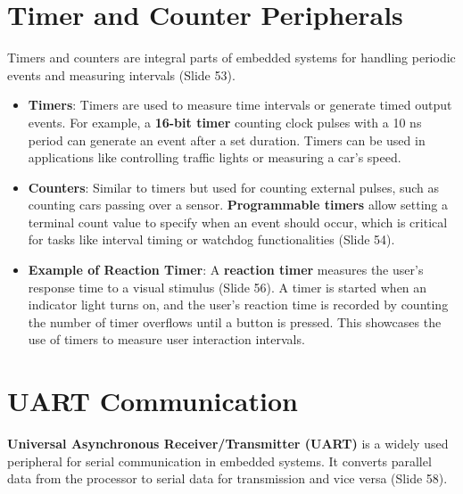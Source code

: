 \documentclass[
  14pt,
  a4paper,
  numbers=noendperiod,
  headinclude=true,
  footinclude=true,
  DIV=calc]{scrreprt}
\begin{document}
\section{Timer and Counter
Peripherals}\label{timer-and-counter-peripherals}

Timers and counters are integral parts of embedded systems for handling
periodic events and measuring intervals (Slide 53).

\begin{itemize}
\item
  \textbf{Timers}: Timers are used to measure time intervals or generate
  timed output events. For example, a \textbf{16-bit timer} counting
  clock pulses with a 10 ns period can generate an event after a set
  duration. Timers can be used in applications like controlling traffic
  lights or measuring a car's speed.
\item
  \textbf{Counters}: Similar to timers but used for counting external
  pulses, such as counting cars passing over a sensor.
  \textbf{Programmable timers} allow setting a terminal count value to
  specify when an event should occur, which is critical for tasks like
  interval timing or watchdog functionalities (Slide 54).
\item
  \textbf{Example of Reaction Timer}: A \textbf{reaction timer} measures
  the user's response time to a visual stimulus (Slide 56). A timer is
  started when an indicator light turns on, and the user's reaction time
  is recorded by counting the number of timer overflows until a button
  is pressed. This showcases the use of timers to measure user
  interaction intervals.
\end{itemize}

\section{UART Communication}\label{uart-communication}

\textbf{Universal Asynchronous Receiver/Transmitter (UART)} is a widely
used peripheral for serial communication in embedded systems. It
converts parallel data from the processor to serial data for
transmission and vice versa (Slide 58).
\end{document}
